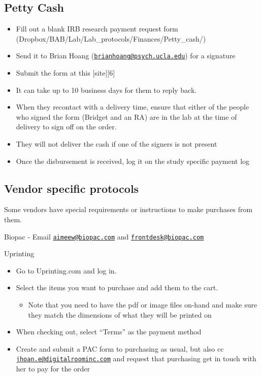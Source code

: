 \documentclass[]{book}
\providecommand{\tightlist}{%
  \setlength{\itemsep}{0pt}\setlength{\parskip}{0pt}}
\begin{document}
\hypertarget{petty-cash}{%
\subsection{Petty Cash}\label{petty-cash}}

\begin{itemize}
\tightlist
\item
  Fill out a blank IRB research payment request form (Dropbox/BAB/Lab/Lab\_protocols/Finances/Petty\_cash/)
\item
  Send it to Brian Hoang (\href{mailto:brianhoang@psych.ucla.edu}{\nolinkurl{brianhoang@psych.ucla.edu}}) for a signature
\item
  Submit the form at this {[}site{]}{[}6{]}
\item
  It can take up to 10 business days for them to reply back.
\item
  When they recontact with a delivery time, ensure that either of the people who signed the form (Bridget and an RA) are in the lab at the time of delivery to sign off on the order.
\item
  They will not deliver the cash if one of the signers is not present
\item
  Once the disbursement is received, log it on the study specific payment log
\end{itemize}

\hypertarget{vendor-specific-protocols}{%
\subsection{Vendor specific protocols}\label{vendor-specific-protocols}}

Some vendors have special requirements or instructions to make purchases from them.

Biopac
- Email \href{mailto:aimeew@biopac.com}{\nolinkurl{aimeew@biopac.com}} and \href{mailto:frontdesk@biopac.com}{\nolinkurl{frontdesk@biopac.com}}

Uprinting

\begin{itemize}
\tightlist
\item
  Go to Uprinting.com and log in.
\item
  Select the items you want to purchase and add them to the cart.

  \begin{itemize}
  \tightlist
  \item
    Note that you need to have the pdf or image files on-hand and make sure they match the dimensions of what they will be printed on
  \end{itemize}
\item
  When checking out, select ``Terms'' as the payment method
\item
  Create and submit a PAC form to purchasing as usual, but also cc \href{mailto:jhoan.e@digitalroominc.com}{\nolinkurl{jhoan.e@digitalroominc.com}} and request that purchasing get in touch with her to pay for the order
\end{itemize}
\end{document}

